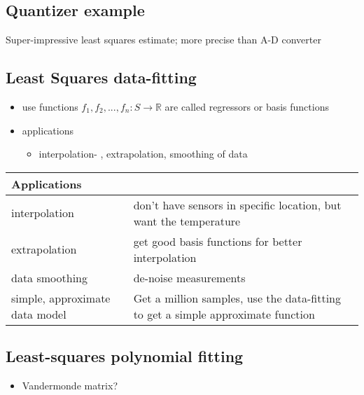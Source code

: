 \documentclass[10pt,letterpaper]{article}
\begin{document}
\subsection{Quantizer example}
\label{sec-4_10}

Super-impressive least squares estimate; more precise than A-D converter
\subsection{Least Squares data-fitting}
\label{sec-4_11}

\begin{itemize}
\item use functions $f_1, f_2, ..., f_n:S \rightarrow \mathbb{R}$ are called regressors or basis functions
\item applications

\begin{itemize}
\item interpolation- , extrapolation, smoothing of data
\end{itemize}

\end{itemize}

\begin{center}
\begin{tabular}{ll}
 Applications                    &                                                                                    \\
\hline
 interpolation                   &  don't have sensors in specific location, but want the temperature                 \\
 extrapolation                   &  get good basis functions for better interpolation                                 \\
 data smoothing                  &  de-noise measurements                                                             \\
 simple, approximate data model  &  Get a million samples, use the data-fitting to get a simple approximate function  \\
\end{tabular}
\end{center}
\subsection{Least-squares polynomial fitting}
\label{sec-4_12}

\begin{itemize}
\item Vandermonde matrix?
\end{itemize}
\end{document}
